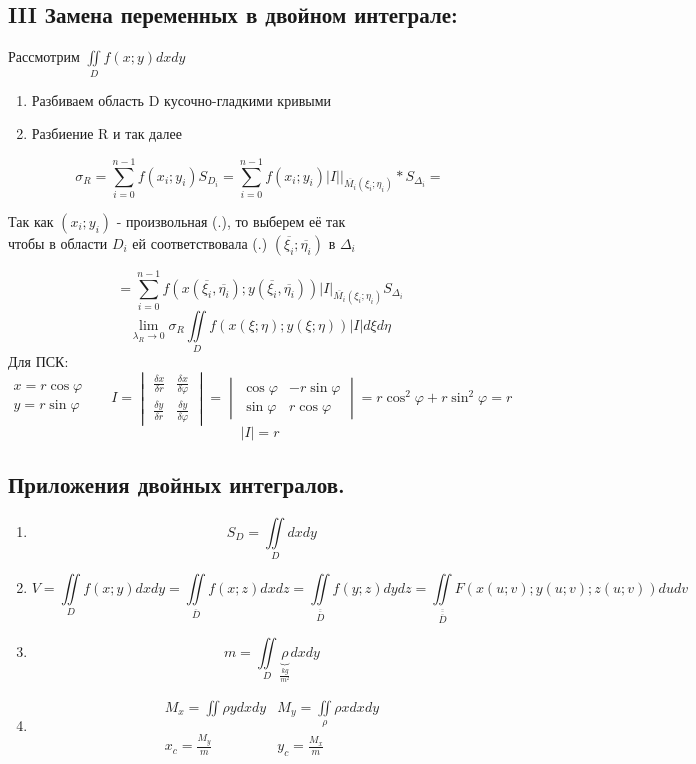\documentclass[12pt]{article}
\let\oldiint\iint
\let\oldsum\sum
\let\oldlim\lim
\renewcommand{\iint}{\oldiint\limits}
\renewcommand{\sum}{\oldsum\limits}
\renewcommand{\lim}{\oldlim\limits}
\begin{document}
  \subsection*{III Замена переменных в двойном интеграле:}
  Рассмотрим $\iint_{D} f(x;y)dxdy$\\
  \begin{enumerate}
    \item Разбиваем область D кусочно-гладкими кривыми
    \item Разбиение R и так далее
  \end{enumerate}
  \[\sigma_R = \sum_{i=0}^{n-1} f(x_i;y_i)S_{D_i} =\sum_{i=0}^{n-1} f(x_i;y_i) \Big| I \Big| \Big|_{\overline{M_i}(\xi_i;\eta_i)}
  * S_{\Delta_i} \boxed{=} \]
  \begin{center}
    Так как $(x_i;y_i)$ - произвольная (.), то выберем её так\\ 
    чтобы в области $D_i$ ей соответствовала (.) $(\overline{\xi_i};\overline{\eta_i})$ в $\Delta_i$
  \end{center}
  \[\boxed{=} \sum_{i=0}^{n-1} f(x(\overline{\xi_i},\overline{\eta_i});y(\overline{\xi_i},\overline{\eta_i}))
  |I|_{\overline{M_i}(\xi_i;\eta_i)}S_{\Delta_i}\]
  \[\lim_{\lambda_R \to 0} \sigma_R \iint_D f(x(\xi;\eta);y(\xi;\eta))|I|d\xi d\eta\]
  Для ПСК: 
  $
  \begin{matrix}
    x=r\cos\varphi\\
    y=r\sin\varphi
  \end{matrix} \hspace{20pt}
  I = \begin{vmatrix}
    \frac{\delta x}{\delta r} & \frac{\delta x}{\delta \varphi}\\
    \frac{\delta y}{\delta r} & \frac{\delta y}{\delta \varphi}
  \end{vmatrix}=
  \begin{vmatrix}
    \cos\varphi & -r\sin\varphi\\
    \sin \varphi & r\cos\varphi 
  \end{vmatrix} = r\cos^2\varphi+r\sin^2\varphi=r
  $
  \[|I|=r\]
  \subsection{Приложения двойных интегралов.}
  \begin{enumerate}
    \item \[S_D=\iint_D dxdy\]
    \item \[V=\iint_D f(x;y)dxdy=\iint_{\overline{D}} f(x;z)dxdz = \iint_{\overline{\overline{D}}}f(y;z) dydz
    =\iint_{\overline{\overline{\overline{D}}}}F(x(u;v);y(u;v);z(u;v))dudv\]
    \item \[m=\iint_D \underbrace{\rho}_{\frac{kg}{m^2}}dxdy\]
    \item \[
    \begin{matrix}
      M_x=\iint \rho y dxdy & M_y=\iint_{\rho}\rho xdxdy\\
      x_c=\frac{M_y}{m} & y_c=\frac{M_x}{m}
    \end{matrix}\]
  \end{enumerate}
\end{document}
